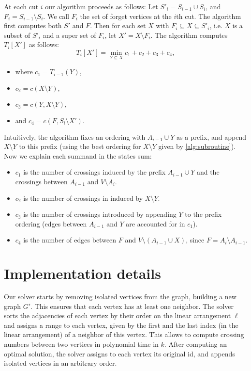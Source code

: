 \documentclass[a4paper,UKenglish,cleveref, autoref, thm-restate]{lipics-v2021}
\begin{document}
At each cut $i$ our algorithm proceeds as follows: 
Let $S'_i = S_{i-1} \cup S_i$, and $F_i = S_{i-1} \setminus S_{i}$. We call $F_i$ the set of forget vertices at the $i$th cut. The algorithm first computes both $S'$ and $F$. Then for each set $X$ with $F_i \subseteq X \subseteq S'_i$, i.e. $X$ is a subset of $S'_i$ and a super set of $F_i$, let $X' = X\setminus F_i$. The algorithm computes $T_{i}[X']$ as follows:
\begin{equation} \label{eq:t-rec}
    T_i[X'] = \min\limits_{Y\subseteq X} c_1 + c_2 + c_3 + c_4,
\end{equation}
\begin{itemize}
    \item where $c_1 = T_{i-1}(Y)$,
    \item $c_2 = c(X\setminus Y)$,
    \item $c_3 = c(Y, X\setminus Y)$,
    \item and $c_4 = c(F, S_i \setminus X')$.
\end{itemize}
Intuitively, the algorithm fixes an ordering with $A_{i-1} \cup Y$ as a prefix, and append $X \setminus Y$ to this prefix (using the best ordering for $X\setminus Y$ given by \cref{alg:subroutine}). Now we explain each summand in the states sum:
\begin{itemize}
    \item $c_1$ is the number of crossings induced by the prefix $A_{i-1}\cup Y$ and the crossings between $A_{i-1}$ and $V\setminus A_i$.
    \item $c_2$ is the number of crossings in induced by $X\setminus Y$.
    \item $c_3$ is the number of crossings introduced by appending $Y$ to the prefix ordering (edges between $A_{i-1}$ and $Y$ are accounted for in $c_1$).
    \item $c_4$ is the number of edges between $F$ and $V\setminus (A_{i-1}\cup X)$, since $F = A_i \setminus A_{i-1}$.
\end{itemize}

\section{Implementation details}

Our solver starts by removing isolated vertices from the graph, building a new graph $G'$. This ensures that each vertex has at least one neighbor. The solver sorts the adjacencies of each vertex by their order on the linear arrangement $\ell$ and assigns a range to each vertex, given by the first and the last index (in the linear arrangement) of a neighbor of this vertex. This allows to compute crossing numbers between two vertices in polynomial time in $k$.
After computing an optimal solution, the solver assigns to each vertex its original id, and appends isolated vertices in an arbitrary order.
\end{document}
